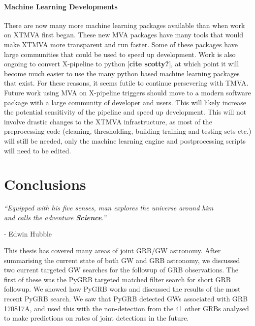 \documentclass[11pt]{cuthesis}
\newcommand{\xp}{X-pipeline }
\begin{document}
\subsubsection{Machine Learning Developments}
There are now many more machine learning packages available than when work on XTMVA first began. These new MVA packages have many tools that would make XTMVA more transparent and run faster. Some of these packages have large communities that could be used to speed up development. Work is also ongoing to convert \xp to python [\textbf{cite scotty?}], at which point it will become much easier to use the many python based machine learning packages that exist. For these reasons, it seems futile to continue persevering with TMVA. Future work using MVA on \xp triggers should move to a modern software package with a large community of developer and users. This will likely increase the potential sensitivity of the pipeline and speed up development. This will not involve drastic changes to the XTMVA infrastructure, as most of the preprocessing code (cleaning, thresholding, building training and testing sets etc.) will still be needed, only the machine learning engine and postprocessing scripts will need to be edited.

\chapter{Conclusions}
\begin{center}

\textit{``Equipped with his five senses, man explores the universe around him\\ and calls the adventure \textbf{Science}.''}
\end{center}
\begin{flushright}

- Edwin Hubble
\end{flushright}

\vspace{20pt}


This thesis has covered many areas of joint GRB/GW astronomy. After summarising the current state of both GW and GRB astronomy, we discussed two current targeted GW searches for the followup of GRB observations. The first of these was the PyGRB targeted matched filter search for short GRB followup. We showed how PyGRB works and discussed the results of the most recent PyGRB search. We saw that PyGRB detected GWs associated with GRB 170817A, and used this with the non-detection from the 41 other GRBs analysed to make predictions on rates of joint detections in the future. 
\end{document}
